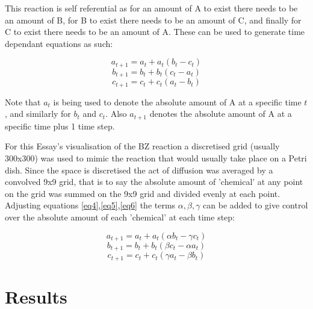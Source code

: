 \documentclass[12pt, A4]{article}
\begin{document}
This reaction is self referential as for an amount of A to exist there needs to be an 
amount of B, for B to exist there needs to be an amount of C, and finally for C to exist there 
needs to be an amount of A. These can be used to generate time dependant equations as such:

\begin{equation}\label{eq4}
  a_{t+1}=a_t+a_t(b_t-c_t)
\end{equation}
\begin{equation}\label{eq5}
  b_{t+1}=b_t+b_t(c_t-a_t)
\end{equation}
\begin{equation}\label{eq6}
  c_{t+1}=c_t+c_t(a_t-b_t)
\end{equation}

Note that $a_t$ is being used to denote the absolute amount of A at a specific time $t$, and 
similarly for $b_t$ and $c_t$. Also $a_{t+1}$ denotes the absolute amount of A at a specific time 
plus 1 time step.


For this Essay's visualisation of the BZ reaction a discretised grid (usually 300x300) was used to mimic 
the reaction that would usually take place on a Petri dish. Since the space is discretised 
the act of diffusion was averaged by a convolved 9x9 grid, that is to say the absolute 
amount of 'chemical' at any point on the grid was summed on the 9x9 grid and divided evenly 
at each point. Adjusting equations \ref{eq4},\ref{eq5},\ref{eq6} the terms $\alpha,\beta,\gamma$ 
can be added to give control over the absolute amount of each 'chemical' at each time step:

\begin{equation}\label{eq7}
  a_{t+1}=a_t+a_t(\alpha b_t-\gamma c_t)
\end{equation}
\begin{equation}\label{eq8}
  b_{t+1}=b_t+b_t(\beta c_t-\alpha a_t)
\end{equation}
\begin{equation}\label{eq9}
  c_{t+1}=c_t+c_t(\gamma a_t-\beta b_t)
\end{equation}

\section{Results}
\label{sec:Results}
\end{document}

